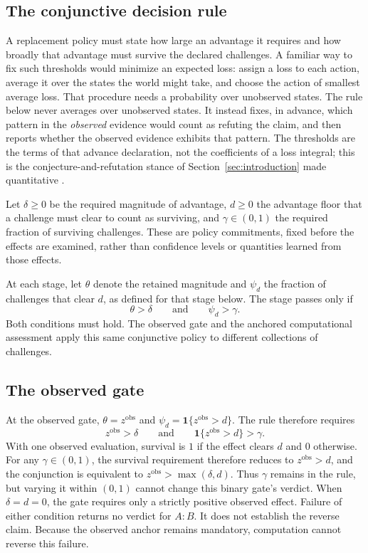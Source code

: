 \documentclass[11pt]{article}
\theoremstyle{remark}
\begin{document}
\subsection{The conjunctive decision rule}

A replacement policy must state how large an advantage it requires and how
broadly that advantage must survive the declared challenges. A familiar way to fix such thresholds would minimize an expected loss: assign a
loss to each action, average it over the states the world might take, and choose
the action of smallest average loss. That procedure needs a probability over
unobserved states. The rule below never averages over unobserved states. It
instead fixes, in advance, which pattern in the \emph{observed} evidence would
count as refuting the claim, and then reports whether the observed evidence
exhibits that pattern. The thresholds are the terms of that advance declaration,
not the coefficients of a loss integral; this is the conjecture-and-refutation
stance of Section~\ref{sec:introduction} made quantitative
\cite{popper1959logic,popper1963conjectures}.

Let $\delta\geq0$ be the required magnitude of advantage, $d\geq0$ the
advantage floor that a challenge must clear to count as surviving, and
$\gamma\in(0,1)$ the required fraction of surviving challenges. These are
policy commitments,
fixed before the effects are examined, rather than confidence levels or
quantities learned from those effects.

At each stage, let $\theta$ denote the retained magnitude and $\psi_d$ the
fraction of challenges that clear $d$, as defined for that stage below.
The stage passes only if
\begin{equation}
\theta>\delta
\qquad\text{and}\qquad
\psi_d>\gamma.
\label{eq:context-decision-rule}
\end{equation}
Both conditions must hold. The observed gate and the anchored computational
assessment apply this same conjunctive policy to different collections of
challenges.

\subsection{The observed gate}

At the observed gate, $\theta=z^{\mathrm{obs}}$ and
$\psi_d=\mathbf1\{z^{\mathrm{obs}}>d\}$. The rule therefore requires
\begin{equation}
z^{\mathrm{obs}}>\delta
\qquad\text{and}\qquad
\mathbf1\{z^{\mathrm{obs}}>d\}>\gamma.
\label{eq:context-observed-gate}
\end{equation}
With one observed evaluation, survival is $1$ if the effect clears $d$ and
$0$ otherwise. For any $\gamma\in(0,1)$, the survival requirement therefore
reduces to $z^{\mathrm{obs}}>d$, and the conjunction is equivalent to
$z^{\mathrm{obs}}>\max(\delta,d)$. Thus $\gamma$ remains in the rule, but
varying it within $(0,1)$ cannot change this binary gate's verdict. When
$\delta=d=0$, the gate requires only a strictly positive observed effect.
Failure of either condition returns no verdict for $A:B$. It does not establish the
reverse claim. Because the observed anchor remains mandatory, computation
cannot reverse this failure.
\end{document}
